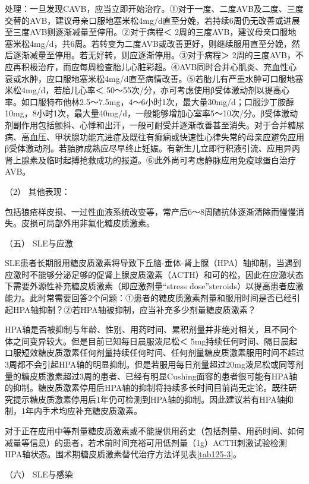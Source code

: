 处理：一旦发现CAVB，应当立即开始治疗。①对于一度、二度AVB及二度、三度交替的AVB，建议母亲口服地塞米松4mg/d直至分娩，若持续6周仍无改善或进展至三度AVB则逐渐减量至停用。②对于病程＜
2周的三度AVB，建议母亲口服地塞米松4mg/d，共6周。若转变为二度AVB或改善更好，则继续服用直至分娩，然后逐渐减量至停用。若无好转，则应逐渐停用。③对于病程＞
2周的三度AVB，不应再积极治疗，而应每周检查胎儿心脏彩超。④AVB同时合并心肌炎、充血性心衰或水肿，应口服地塞米松4mg/d直至病情改善。⑤若胎儿有严重水肿可口服地塞米松4mg/d，若胎儿心率＜
50～55次/分，亦可考虑使用β受体激动剂以提高心率。如口服特布他林2.5～7.5mg，4～6小时1次，最大量30mg/d；口服沙丁胺醇10mg，8小时1次，最大量40mg/d，一般能够增加心室率5～10次/分。β受体激动剂副作用包括颤抖、心悸和出汗，一般可耐受并逐渐改善甚至消失。对于合并糖尿病、高血压、甲状腺功能亢进症及既往有癫痫或快速性心律失常的母亲应避免应用β受体激动剂。若胎肺成熟应尽早终止妊娠。有新生儿立即行积液引流、应用异丙肾上腺素及临时起搏抢救成功的报道。⑥此外尚可考虑静脉应用免疫球蛋白治疗AVB。

\hypertarget{text00347.htmlux5cux23CHP14-1-3-9-4-4-2}{}
（2） 其他表现：

包括狼疮样皮损、一过性血液系统改变等，常产后6～8周随抗体逐渐清除而慢慢消失。皮损可局部外用非氟化糖皮质激素。

\hypertarget{text00347.htmlux5cux23CHP14-1-3-9-5}{}
（五） SLE与应激

SLE患者长期服用糖皮质激素将导致下丘脑-垂体-肾上腺（HPA）轴抑制，当遇到应激时不能够分泌足够的促肾上腺皮质激素（ACTH）和可的松，因此在应激状态下需要外源性补充糖皮质激素（即应激剂量“stress
dose”steroids）以提高患者应激能力。此时常需要回答2个问题：①患者的糖皮质激素剂量和服用时间是否已经引起HPA轴抑制？②若HPA轴被抑制，应当补充多少剂量糖皮质激素？

HPA轴是否被抑制与年龄、性别、用药时间、累积剂量并非绝对相关，且不同个体之间变异较大。但是目前已知每日晨服泼尼松＜
5mg持续任何时间、隔日晨起口服短效糖皮质激素任何剂量持续任何时间、任何剂量糖皮质激素服用时间不超过3周都不会引起HPA轴的明显抑制。但是若服用每日剂量超过20mg泼尼松或同等剂量的糖皮质激素超过3周的患者、已经有明显Cushing面容的患者很可能有HPA轴的抑制。糖皮质激素停用后HPA轴的抑制将持续多长时间目前尚无定论。既往研究提示糖皮质激素停用后1年仍可检测到HPA轴的抑制。因此建议若有HPA轴抑制，1年内手术均应补充糖皮质激素。

对于正在应用中等剂量糖皮质激素或不能提供用药史（包括剂量、用药时间、如何减量等信息）的患者，若术前时间充裕可用低剂量（1g）ACTH刺激试验检测HPA轴状态。围术期糖皮质激素替代治疗方法详见表\ref{tab125-3}。

\hypertarget{text00347.htmlux5cux23CHP14-1-3-9-6}{}
（六） SLE与感染

